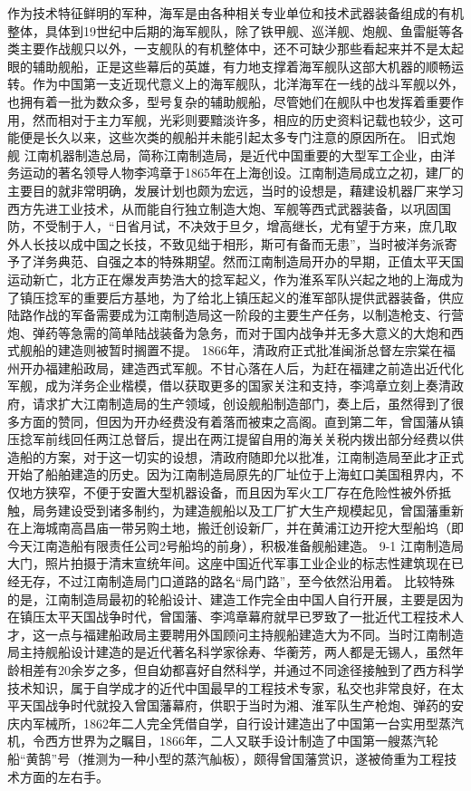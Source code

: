 \documentclass[12pt,UTF8]{ctexbook}
\begin{document}
作为技术特征鲜明的军种，海军是由各种相关专业单位和技术武器装备组成的有机整体，具体到19世纪中后期的海军舰队，除了铁甲舰、巡洋舰、炮舰、鱼雷艇等各类主要作战舰只以外，一支舰队的有机整体中，还不可缺少那些看起来并不是太起眼的辅助舰船，正是这些幕后的英雄，有力地支撑着海军舰队这部大机器的顺畅运转。作为中国第一支近现代意义上的海军舰队，北洋海军在一线的战斗军舰以外，也拥有着一批为数众多，型号复杂的辅助舰船，尽管她们在舰队中也发挥着重要作用，然而相对于主力军舰，光彩则要黯淡许多，相应的历史资料记载也较少，这可能便是长久以来，这些次类的舰船并未能引起太多专门注意的原因所在。
旧式炮舰
江南机器制造总局，简称江南制造局，是近代中国重要的大型军工企业，由洋务运动的著名领导人物李鸿章于1865年在上海创设。江南制造局成立之初，建厂的主要目的就非常明确，发展计划也颇为宏远，当时的设想是，藉建设机器厂来学习西方先进工业技术，从而能自行独立制造大炮、军舰等西式武器装备，以巩固国防，不受制于人，“日省月试，不决效于旦夕，增高继长，尤有望于方来，庶几取外人长技以成中国之长技，不致见绌于相形，斯可有备而无患”，当时被洋务派寄予了洋务典范、自强之本的特殊期望。然而江南制造局开办的早期，正值太平天国运动新亡，北方正在爆发声势浩大的捻军起义，作为淮系军队兴起之地的上海成为了镇压捻军的重要后方基地，为了给北上镇压起义的淮军部队提供武器装备，供应陆路作战的军备需要成为江南制造局这一阶段的主要生产任务，以制造枪支、行营炮、弹药等急需的简单陆战装备为急务，而对于国内战争并无多大意义的大炮和西式舰船的建造则被暂时搁置不提。
1866年，清政府正式批准闽浙总督左宗棠在福州开办福建船政局，建造西式军舰。不甘心落在人后，为赶在福建之前造出近代化军舰，成为洋务企业楷模，借以获取更多的国家关注和支持，李鸿章立刻上奏清政府，请求扩大江南制造局的生产领域，创设舰船制造部门，奏上后，虽然得到了很多方面的赞同，但因为开办经费没有着落而被束之高阁。直到第二年，曾国藩从镇压捻军前线回任两江总督后，提出在两江提留自用的海关关税内拨出部分经费以供造船的方案，对于这一切实的设想，清政府随即允以批准，江南制造局至此才正式开始了船舶建造的历史。因为江南制造局原先的厂址位于上海虹口美国租界内，不仅地方狭窄，不便于安置大型机器设备，而且因为军火工厂存在危险性被外侨抵触，局务建设受到诸多制约，为建造舰船以及工厂扩大生产规模起见，曾国藩重新在上海城南高昌庙一带另购土地，搬迁创设新厂，并在黄浦江边开挖大型船坞（即今天江南造船有限责任公司2号船坞的前身），积极准备舰船建造。
9-1
江南制造局大门，照片拍摄于清末宣统年间。这座中国近代军事工业企业的标志性建筑现在已经无存，不过江南制造局门口道路的路名“局门路”，至今依然沿用着。
比较特殊的是，江南制造局最初的轮船设计、建造工作完全由中国人自行开展，主要是因为在镇压太平天国战争时代，曾国藩、李鸿章幕府就早已罗致了一批近代工程技术人才，这一点与福建船政局主要聘用外国顾问主持舰船建造大为不同。当时江南制造局主持舰船设计建造的是近代著名科学家徐寿、华蘅芳，两人都是无锡人，虽然年龄相差有20余岁之多，但自幼都喜好自然科学，并通过不同途径接触到了西方科学技术知识，属于自学成才的近代中国最早的工程技术专家，私交也非常良好，在太平天国战争时代就投入曾国藩幕府，供职于当时为湘、淮军队生产枪炮、弹药的安庆内军械所，1862年二人完全凭借自学，自行设计建造出了中国第一台实用型蒸汽机，令西方世界为之瞩目，1866年，二人又联手设计制造了中国第一艘蒸汽轮船“黄鹄”号（推测为一种小型的蒸汽舢板），颇得曾国藩赏识，遂被倚重为工程技术方面的左右手。
\end{document}
